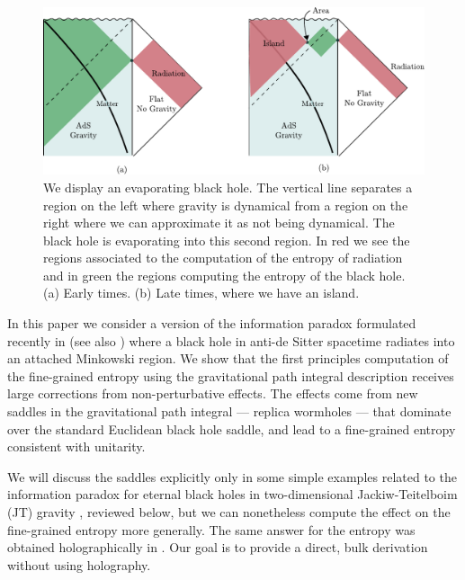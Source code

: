 \begin{figure}
\begin{center}
\includegraphics[scale=0.8]{figures/evaporation-island.pdf}
\end{center}
\caption{  We display an evaporating black hole. The vertical line separates a region on the left where gravity is dynamical from a region on the right where we can approximate it as not being dynamical. The black hole is evaporating into this second region. In red we see the regions associated to the computation of the entropy of radiation and in green the regions computing the entropy of the black hole. (a) Early times. (b) Late times, where we have an island. } 
\label{fig:QESreview}
\end{figure}


In this paper we consider a version of the information paradox formulated recently in \cite{Penington:2019npb,Almheiri:2019psf} (see also \cite{Mathur:2014dia})
where a black hole in anti-de Sitter spacetime radiates into an attached Minkowski region.  We show that the first principles computation of the fine-grained entropy using the gravitational path integral description   receives large corrections from non-perturbative effects. The effects come from new saddles in the gravitational path integral --- replica wormholes --- that dominate over the standard Euclidean black hole saddle, and lead to a fine-grained entropy consistent with unitarity.   



We will discuss the saddles explicitly only in some simple examples related to the information paradox for eternal black holes in two-dimensional Jackiw-Teitelboim (JT) gravity \cite{Jackiw:1984je,Teitelboim:1983ux,Almheiri:2014cka}, reviewed below, but we can nonetheless compute the effect on the fine-grained entropy more generally.
The same answer for the entropy was obtained holographically in \cite{Almheiri:2019hni,Chen:2019uhq,Rozali:2019day}. 
Our goal is to provide a direct, bulk derivation   without using holography.




